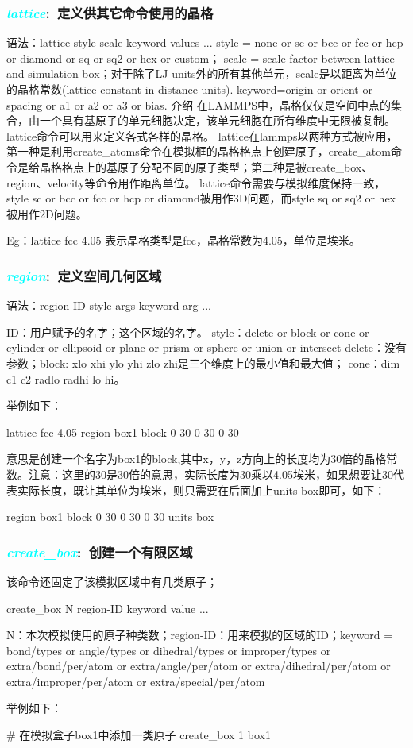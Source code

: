 \frame
{
	\frametitle{\textcolor{cyan}{\textit{lattice}}:~定义供其它命令使用的晶格}
	        语法：lattice style scale keyword values ...
        style = none or sc or bcc or fcc or hcp or diamond or sq or sq2 or hex or custom；
        scale = scale factor between lattice and simulation box；对于除了LJ units外的所有其他单元，scale是以距离为单位的晶格常数(lattice constant in distance units).
        keyword=origin or orient or spacing or a1 or a2 or a3 or bias.
        介绍
            在LAMMPS中，晶格仅仅是空间中点的集合，由一个具有基原子的单元细胞决定，该单元细胞在所有维度中无限被复制。lattice命令可以用来定义各式各样的晶格。
            lattice在lammps以两种方式被应用，第一种是利用create_atoms命令在模拟框的晶格格点上创建原子，create_atom命令是给晶格格点上的基原子分配不同的原子类型；第二种是被create_box、region、velocity等命令用作距离单位。
            lattice命令需要与模拟维度保持一致，style sc or bcc or fcc or hcp or diamond被用作3D问题，而style sq or sq2 or hex 被用作2D问题。

Eg：lattice fcc 4.05 表示晶格类型是fcc，晶格常数为4.05，单位是埃米。
}

\frame
{
	\frametitle{\textcolor{cyan}{\textit{region}}:~定义空间几何区域}
	语法：region ID style args keyword arg ...

        ID：用户赋予的名字；这个区域的名字。
        style：delete or block or cone or cylinder or ellipsoid or plane or prism or sphere or union or intersect
        delete：没有参数；block: xlo xhi ylo yhi zlo zhi是三个维度上的最小值和最大值；
        cone：dim c1 c2 radlo radhi lo hi。

举例如下：

lattice fcc 4.05
region box1 block 0 30 0 30 0 30

意思是创建一个名字为box1的block,其中x，y，z方向上的长度均为30倍的晶格常数。注意：这里的30是30倍的意思，实际长度为30乘以4.05埃米，如果想要让30代表实际长度，既让其单位为埃米，则只需要在后面加上units box即可，如下：

region box1 block 0 30 0 30 0 30 units box
}

\frame
{
	\frametitle{\textcolor{cyan}{\textit{create\_box}}:~创建一个有限区域}
	该命令还固定了该模拟区域中有几类原子；

create_box N region-ID keyword value ...

    N：本次模拟使用的原子种类数；region-ID：用来模拟的区域的ID；keyword = bond/types or angle/types or dihedral/types or improper/types or extra/bond/per/atom or extra/angle/per/atom or extra/dihedral/per/atom or extra/improper/per/atom or extra/special/per/atom

举例如下：

# 在模拟盒子box1中添加一类原子
create_box 1 box1
}

